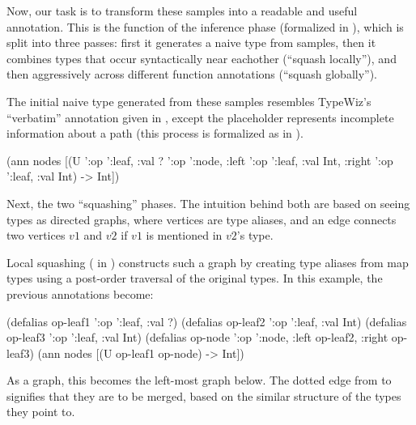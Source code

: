 Now, our task is to transform these samples into a readable and useful annotation.
This is the function of the inference phase (formalized in ),
which is split into three passes: first it generates a naive type from samples, then it
combines types that occur syntactically near eachother (``squash locally''),
and then aggressively across different function annotations (``squash globally'').

The initial naive type generated from these samples resembles TypeWiz's
``verbatim'' annotation given in , except
the  placeholder represents incomplete information about a path
(this process is formalized as \generatetenv{} in ).

\begin{cljlisting}
(ann nodes [(U '{:op ':leaf, :val ?} '{:op ':node,
                                       :left '{:op ':leaf, :val Int},
                                       :right '{:op ':leaf, :val Int}}) -> Int])
\end{cljlisting}

Next, the two ``squashing'' phases.
The intuition behind both are based on seeing types as directed graphs,
where vertices are type aliases, and an edge connects
two vertices $v1$ and $v2$ if $v1$ is mentioned in $v2$'s type.

Local squashing (\squashlocal{} in )
constructs such a graph by creating type aliases from map types
using a post-order traversal of the original types.
In this example, the previous annotations become:

\begin{cljlisting}
(defalias op-leaf1 '{:op ':leaf, :val ?})
(defalias op-leaf2 '{:op ':leaf, :val Int})
(defalias op-leaf3 '{:op ':leaf, :val Int})
(defalias op-node '{:op ':node, :left op-leaf2, :right op-leaf3})
(ann nodes [(U op-leaf1 op-node) -> Int])
\end{cljlisting}

As a graph, this becomes the left-most graph below. The dotted edge
from  to  signifies that they are to be merged,
based on the similar structure of the types they point to.

